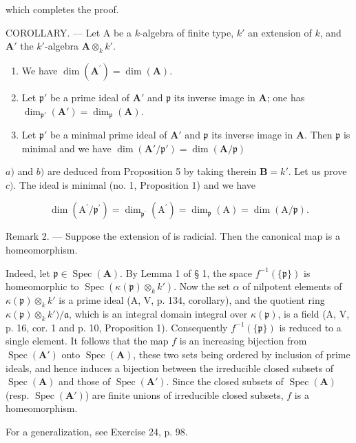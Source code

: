 which completes the proof.

COROLLARY. --- Let A be a \(k\)-algebra of finite type, \(k'\) an extension of \(k\), and \(\mathbf{A}'\) the \(k'\)-algebra \(\mathbf{A} \otimes_k k'\).

\begin{enumerate}
\def\labelenumi{\alph{enumi})}
\item
  We have \(\dim (\mathbf{A}^{\prime}) = \dim (\mathbf{A})\).
\item
  Let \(\mathfrak{p}'\) be a prime ideal of \(\mathbf{A}'\) and \(\mathfrak{p}\) its inverse image in \(\mathbf{A}\); one has \(\dim_{\mathfrak{p}'}(\mathbf{A}') = \dim_{\mathfrak{p}}(\mathbf{A})\).
\item
  Let \(\mathfrak{p}'\) be a minimal prime ideal of \(\mathbf{A}'\) and \(\mathfrak{p}\) its inverse image in \(\mathbf{A}\). Then \(\mathfrak{p}\) is minimal and we have \(\dim(\mathbf{A}'/\mathfrak{p}') = \dim(\mathbf{A}/\mathfrak{p})\)
\end{enumerate}

\(a)\) and \(b)\) are deduced from Proposition 5 by taking therein \(\mathbf{B} = k'\). Let us prove \(c)\). The ideal  is minimal (no. 1, Proposition 1) and we have

\[
\dim (\mathrm{A} ^ {\prime} / \mathfrak {p} ^ {\prime}) = \dim_ {\mathfrak {p} ^ {\prime}} (\mathrm{A} ^ {\prime}) = \dim_ {\mathfrak {p}} (\mathrm{A}) = \dim (\mathrm{A} / \mathfrak {p}).
\]

Remark 2. --- Suppose the extension  of  is radicial. Then the canonical map  is a homeomorphism.

Indeed, let \(\mathfrak{p} \in \operatorname{Spec}(\mathbf{A})\). By Lemma 1 of § 1, the space \(f^{-1}(\{\mathfrak{p}\})\) is homeomorphic to \(\operatorname{Spec}(\kappa(\mathfrak{p}) \otimes_k k')\). Now the set \(\alpha\) of nilpotent elements of \(\kappa(\mathfrak{p}) \otimes_k k'\) is a prime ideal (A, V, p. 134, corollary), and the quotient ring \(\kappa(\mathfrak{p}) \otimes_k k')/\mathfrak{a}\), which is an integral domain integral over \(\kappa(\mathfrak{p})\), is a field (A, V, p. 16, cor. 1 and p. 10, Proposition 1). Consequently \(f^{-1}(\{\mathfrak{p}\})\) is reduced to a single element. It follows that the map \(f\) is an increasing bijection from \(\operatorname{Spec}(\mathbf{A}')\) onto \(\operatorname{Spec}(\mathbf{A})\), these two sets being ordered by inclusion of prime ideals, and hence induces a bijection between the irreducible closed subsets of \(\operatorname{Spec}(\mathbf{A})\) and those of \(\operatorname{Spec}(\mathbf{A}')\). Since the closed subsets of \(\operatorname{Spec}(\mathbf{A})\) (resp. \(\operatorname{Spec}(\mathbf{A}')\)) are finite unions of irreducible closed subsets, \(f\) is a homeomorphism.

For a generalization, see Exercise 24, p. 98.


